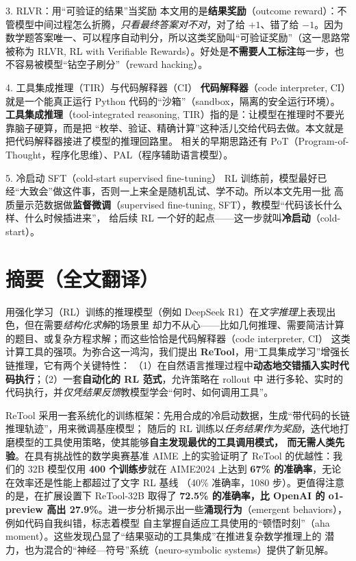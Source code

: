 \documentclass[11pt,UTF8,fontset=fandol]{ctexart}
\begin{document}
\begin{infobox}{3. RLVR：用“可验证的结果”当奖励}
本文用的是\textbf{结果奖励}（outcome reward）：不管模型中间过程怎么折腾，\emph{只看最终答案对不对}，对了给
$+1$、错了给 $-1$。因为数学题答案唯一、可以程序自动判分，所以这类奖励叫“可验证奖励”（这一思路常被称为
RLVR, RL with Verifiable Rewards）。好处是\textbf{不需要人工标注}每一步，也不容易被模型“钻空子刷分”（reward hacking）。
\end{infobox}

\begin{infobox}{4. 工具集成推理（TIR）与代码解释器（CI）}
\textbf{代码解释器}（code interpreter, CI）就是一个能真正运行 Python 代码的“沙箱”（sandbox，隔离的安全运行环境）。
\textbf{工具集成推理}（tool-integrated reasoning, TIR）指的是：让模型在推理时不要光靠脑子硬算，而是把
“枚举、验证、精确计算”这种活儿交给代码去做。本文就是把代码解释器接进了模型的推理回路里。
相关的早期思路还有 PoT（Program-of-Thought，程序化思维）、PAL（程序辅助语言模型）。
\end{infobox}

\begin{infobox}{5. 冷启动 SFT（cold-start supervised fine-tuning）}
RL 训练前，模型最好已经“大致会”做这件事，否则一上来全是随机乱试、学不动。所以本文先用一批
高质量示范数据做\textbf{监督微调}（supervised fine-tuning, SFT），教模型“代码该长什么样、什么时候插进来”，
给后续 RL 一个好的起点——这一步就叫\textbf{冷启动}（cold-start）。
\end{infobox}

\section{摘要（全文翻译）}

用强化学习（RL）训练的推理模型（例如 DeepSeek R1）在\emph{文字推理}上表现出色，但在需要\emph{结构化求解}的场景里
却力不从心——比如几何推理、需要简洁计算的题目、或复杂方程求解；而这些恰恰是代码解释器（code interpreter, CI）
这类计算工具的强项。为弥合这一鸿沟，我们提出 \textbf{ReTool}，用“工具集成学习”增强长链推理，它有两个关键特性：
（1）在自然语言推理过程中\textbf{动态地交错插入实时代码执行}；（2）一套\textbf{自动化的 RL 范式}，允许策略在 rollout 中
进行多轮、实时的代码执行，并\emph{仅凭结果反馈}教模型学会“何时、如何调用工具”。

ReTool 采用一套系统化的训练框架：先用合成的冷启动数据，生成“带代码的长链推理轨迹”，用来微调基座模型；
随后的 RL 训练以\emph{任务结果作为奖励}，迭代地打磨模型的工具使用策略，使其能够\textbf{自主发现最优的工具调用模式，
而无需人类先验}。在具有挑战性的数学奥赛基准 AIME 上的实验证明了 ReTool 的优越性：我们的 32B 模型仅用
\textbf{400 个训练步}就在 AIME2024 上达到 \textbf{67\% 的准确率}，无论在效率还是性能上都超过了文字 RL 基线
（40\% 准确率，1080 步）。更值得注意的是，在扩展设置下 ReTool-32B 取得了 \textbf{72.5\% 的准确率，比 OpenAI 的
o1-preview 高出 27.9\%}。进一步分析揭示出一些\textbf{涌现行为}（emergent behaviors），例如代码自我纠错，标志着模型
自主掌握自适应工具使用的“顿悟时刻”（aha moment）。这些发现凸显了“结果驱动的工具集成”在推进复杂数学推理上的
潜力，也为混合的“神经—符号”系统（neuro-symbolic systems）提供了新见解。
\end{document}
